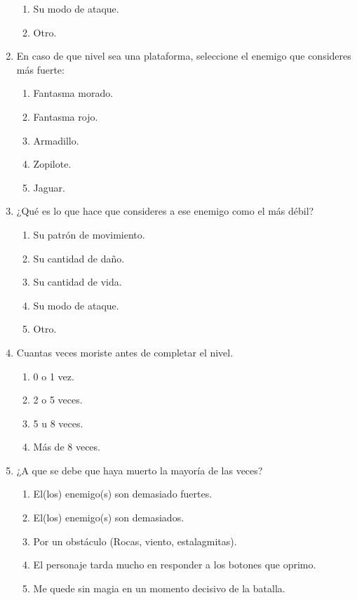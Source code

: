 \begin{enumerate}
\begin{enumerate}
            \item Su modo de ataque.
            \item Otro.
        \end{enumerate}
    \item En caso de que nivel sea una plataforma, seleccione el enemigo que
    consideres más fuerte:
        \begin{enumerate}
            \item Fantasma morado.
            \item Fantasma rojo.
            \item Armadillo.
            \item Zopilote.
            \item Jaguar.
        \end{enumerate}
    \item ¿Qué es lo que hace que consideres a ese enemigo como el más débil?
        \begin{enumerate}
            \item Su patrón de movimiento.
            \item Su cantidad de daño.
            \item Su cantidad de vida.
            \item Su modo de ataque.
            \item Otro.
        \end{enumerate}
    \item Cuantas veces moriste antes de completar el nivel.
        \begin{enumerate}
            \item 0 o 1 vez.
            \item 2 o 5 veces.
            \item 5 u 8 veces.
            \item Más de 8 veces.
        \end{enumerate}
    \item ¿A que se debe que haya muerto la mayoría de las veces?
        \begin{enumerate}
            \item El(los) enemigo(s) son demasiado fuertes.
            \item El(los) enemigo(s) son demasiados.
            \item Por un obstáculo (Rocas, viento, estalagmitas).
            \item El personaje tarda mucho en responder a los botones que
            oprimo.
            \item Me quede sin magia en un momento decisivo de la batalla.

\end{enumerate}
\end{enumerate}
